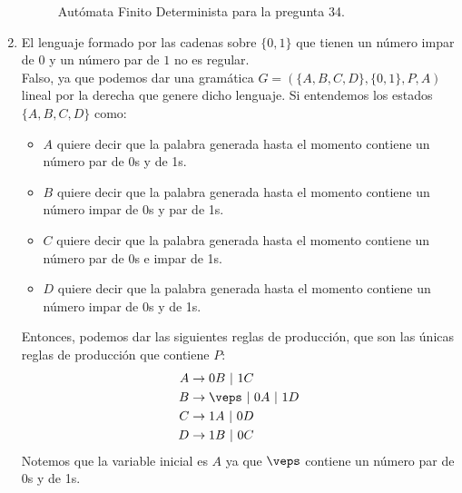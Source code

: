 \begin{enumerate}
\begin{figure}[H]
    \caption{Autómata Finito Determinista para la pregunta 34.}
    \end{figure}

    \item El lenguaje formado por las cadenas sobre $\{0,1\}$ que tienen un número impar de $0$ y un número par de $1$ no es regular.\\

        Falso, ya que podemos dar una gramática $G=(\{A,B,C,D\}, \{0,1\}, P, A)$ lineal por la derecha que genere dicho lenguaje. Si entendemos los estados $\{A,B,C,D\}$ como:
        \begin{itemize}
            \item $A$ quiere decir que la palabra generada hasta el momento contiene un número par de 0s y de 1s.
            \item $B$ quiere decir que la palabra generada hasta el momento contiene un número impar de 0s y par de 1s.
            \item $C$ quiere decir que la palabra generada hasta el momento contiene un número par de 0s e impar de 1s.
            \item $D$ quiere decir que la palabra generada hasta el momento contiene un número impar de 0s y de 1s.
        \end{itemize}
        Entonces, podemos dar las siguientes reglas de producción, que son las únicas reglas de producción que contiene $P$:
        \begin{align*}
            A &\rightarrow 0B\ |\ 1C \\
            B &\rightarrow \veps\ |\ 0A\ |\ 1D \\
            C &\rightarrow 1A\ |\ 0D \\
            D &\rightarrow 1B\ |\ 0C 
        \end{align*}
        Notemos que la variable inicial es $A$ ya que $\veps$ contiene un número par de 0s y de 1s.
\end{enumerate}

